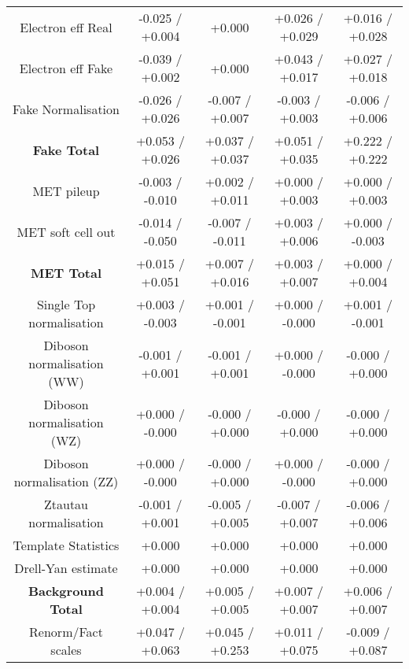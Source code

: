 \begin{table}[htbp]
\begin{center}
\begin{tabular}{|c|c|c|c|c|}
Electron eff Real                     &-0.025   / +0.004   & +0.000              & +0.026   / +0.029   & +0.016   / +0.028  \\
Electron eff Fake                     &-0.039   / +0.002   & +0.000              & +0.043   / +0.017   & +0.027   / +0.018  \\
Fake Normalisation                    &-0.026   / +0.026   & -0.007   / +0.007   & -0.003   / +0.003   & -0.006   / +0.006  \\
\hline
\textbf{Fake Total}                   &+0.053   / +0.026   & +0.037   / +0.037   & +0.051   / +0.035   & +0.222   / +0.222  \\
\hline
MET pileup                            &-0.003   / -0.010   & +0.002   / +0.011   & +0.000   / +0.003   & +0.000   / +0.003  \\
MET soft cell out                     &-0.014   / -0.050   & -0.007   / -0.011   & +0.003   / +0.006   & +0.000   / -0.003  \\
\hline
\textbf{MET Total}                    &+0.015   / +0.051   & +0.007   / +0.016   & +0.003   / +0.007   & +0.000   / +0.004  \\
\hline
Single Top normalisation              &+0.003   / -0.003   & +0.001   / -0.001   & +0.000   / -0.000   & +0.001   / -0.001  \\
Diboson normalisation (WW)            &-0.001   / +0.001   & -0.001   / +0.001   & +0.000   / -0.000   & -0.000   / +0.000  \\
Diboson normalisation (WZ)            &+0.000   / -0.000   & -0.000   / +0.000   & -0.000   / +0.000   & -0.000   / +0.000  \\
Diboson normalisation (ZZ)            &+0.000   / -0.000   & -0.000   / +0.000   & +0.000   / -0.000   & -0.000   / +0.000  \\
Ztautau normalisation                 &-0.001   / +0.001   & -0.005   / +0.005   & -0.007   / +0.007   & -0.006   / +0.006  \\
Template Statistics                   &+0.000              & +0.000              & +0.000              & +0.000             \\
Drell-Yan estimate                    &+0.000              & +0.000              & +0.000              & +0.000             \\
\hline
\textbf{Background Total}             &+0.004   / +0.004   & +0.005   / +0.005   & +0.007   / +0.007   & +0.006   / +0.007  \\
\hline
Renorm/Fact scales                    &+0.047   / +0.063   & +0.045   / +0.253   & +0.011   / +0.075   & -0.009   / +0.087  \\

\end{tabular}
\end{center}
\end{table}
